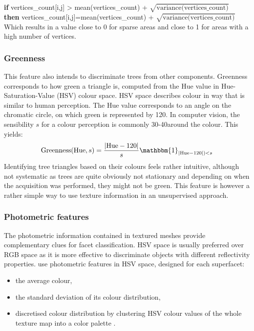 \documentclass{kththesis}
\begin{document}
\textbf{if} vertices\_count[i,j] > mean(vertices\_count) + $\sqrt{\text{variance(vertices\_count)}}$ \\
\textbf{then} vertices\_count[i,j]=mean(vertices\_count) + $\sqrt{\text{variance(vertices\_count)}}$\\

Which results in a value close to 0 for sparse areas and close to 1 for areas with a high number of vertices. 
\subsubsection{Greenness}
This feature also intends to discriminate trees from other components. Greenness corresponds to how green a triangle is, computed from the Hue value in Hue-Saturation-Value (HSV) colour space. HSV space describes colour in way that is similar to human perception. The Hue value corresponds to an angle on the chromatic circle, on which green is represented by 120\degree. In computer vision, the sensibility $s$ for a colour perception is commonly 30-40\degree around the colour. This yields: \\
$$\text{Greenness}(\text{Hue}, s)=\frac{|\text{Hue}-120|}{s} \mathbbm{1}_{|\text{Hue}-120|)<s} $$
Identifying tree triangles based on their colours feels rather intuitive, although not systematic as trees are quite obviously not stationary and depending on when the acquisition was performed, they might not be green. This feature is however a rather simple way to use texture information in an unsupervised approach. 
\subsubsection{Photometric features}
The photometric information contained in textured
meshes provide complementary clues for facet classification. HSV space is usually preferred over RGB space as it is more effective to discriminate objects with different reflectivity properties. \textcite{rouhani} use photometric features in HSV space, designed for each superfacet:
\begin{itemize}
    \item the average colour,
    \item the standard deviation of its colour distribution,
    \item discretised colour distribution by clustering HSV colour values of the whole texture map into a color palette \parencite{color_palette}.
\end{itemize}
\end{document}
